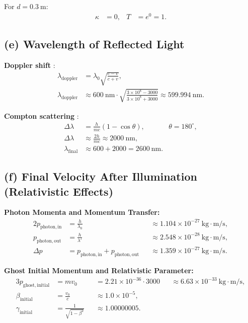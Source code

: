 \documentclass[10pt,a4paper]{article}
\begin{document}
For $d = 0.3~\mathrm{m}$:
\begin{align}
\kappa &= 0, & T &= e^0 = 1.
\end{align}

\vspace{2mm}
\subsection*{(e) Wavelength of Reflected Light}

\textbf{Doppler shift} \cite{HallidayResnick}:
\begin{align}
\lambda_\mathrm{doppler} &= \lambda_0 \sqrt{\frac{c - v}{c + v}}, \\
\lambda_\mathrm{doppler} &\approx 600~\mathrm{nm} \cdot \sqrt{\frac{3\times 10^8 - 3000}{3\times 10^8 + 3000}} \approx 599.994~\mathrm{nm}.
\end{align}

\textbf{Compton scattering} \cite{Compton1923}:
\begin{align}
\Delta \lambda &= \frac{h}{m c} (1 - \cos \theta), & \theta = 180^\circ, \\
\Delta \lambda &\approx \frac{2 h}{m c} \approx 2000~\mathrm{nm}, \\
\lambda_\mathrm{final} &\approx 600 + 2000 = 2600~\mathrm{nm}.
\end{align}

\vspace{2mm}
\subsection*{(f) Final Velocity After Illumination (Relativistic Effects)}

\noindent \textbf{Photon Momenta and Momentum Transfer:}
\begin{alignat}{2}
p_\mathrm{photon,in} &= \frac{h}{\lambda_0} &&\approx 1.104 \times 10^{-27}~\mathrm{kg \cdot m/s}, \\
p_\mathrm{photon,out} &= \frac{h}{\lambda'} &&\approx 2.548 \times 10^{-28}~\mathrm{kg \cdot m/s}, \\
\Delta p &= p_\mathrm{photon,in} + p_\mathrm{photon,out} &&\approx 1.359 \times 10^{-27}~\mathrm{kg \cdot m/s}.
\end{alignat}

\noindent \textbf{Ghost Initial Momentum and Relativistic Parameter:}
\begin{alignat}{3}
p_\mathrm{ghost,initial} &= m v_0 &&= 2.21 \times 10^{-36} \cdot 3000 &&\approx 6.63 \times 10^{-33}~\mathrm{kg \cdot m/s}, \\
\beta_\mathrm{initial} &= \frac{v_0}{c} &&\approx 1.0 \times 10^{-5}, \\
\gamma_\mathrm{initial} &= \frac{1}{\sqrt{1-\beta^2}} &&\approx 1.00000005.
\end{alignat}
\end{document}
